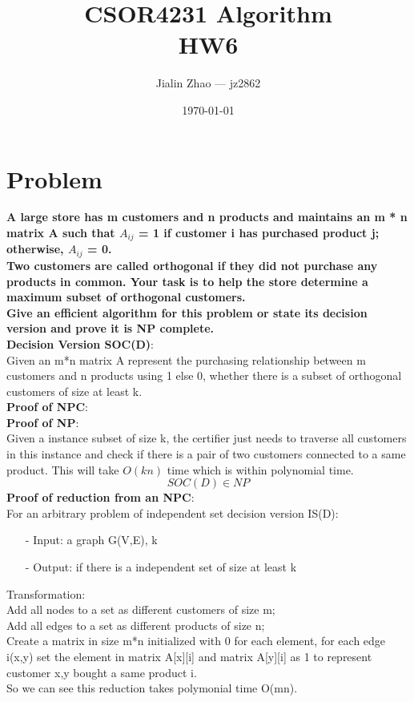 \documentclass{article}
\title{CSOR4231 Algorithm\\HW6}
\author{Jialin Zhao --- jz2862}
\date{\today}
\begin{document}
 
\maketitle{} 
\section{Problem \uppercase\expandafter{}} 
\textbf{A large store has m customers and n products and maintains an m * n matrix A such that $A_{ij}$ = 1 if customer i has purchased product j; otherwise, $A_{ij}$ = 0.\\
Two customers are called orthogonal if they did not purchase any products in common. Your task is to help the store determine a maximum subset of orthogonal customers.\\
Give an efficient algorithm for this problem or state its decision version and prove it is NP complete.\\}
\textbf{\Large Decision Version SOC(D)}:\\
Given an m*n matrix A represent the purchasing relationship between m customers and n products using 1 else 0, whether there is a subset of orthogonal customers of size at least k.\\
\textbf{\Large Proof of NPC}:\\
\textbf{Proof of NP}:\\
Given a instance subset of size k, the certifier just needs to traverse all customers in this instance and check if there is a pair of two customers connected to a same product. This will take $O(kn)$ time which is within polynomial time.
$$SOC(D) \in NP$$
\textbf{Proof of reduction from an NPC}:\\
For an arbitrary problem of independent set decision version IS(D):
\begin{itemize}
\item[-] Input: a graph G(V,E), k
\item[-] Output: if there is a independent set of size at least k
\end{itemize}
Transformation:\\
Add all nodes to a set as different customers of size m;\\
Add all edges to a set as different products of size n;\\
Create a matrix in size m*n initialized with 0 for each element, for each edge i(x,y) set the element in matrix A[x][i] and matrix A[y][i] as 1 to represent customer x,y bought a same product i.\\
So we can see this reduction takes polymonial time O(mn).
\end{document}
